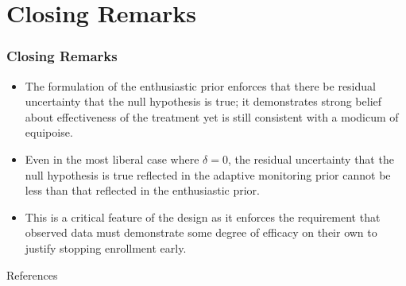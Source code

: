 \documentclass{beamer}
\begin{document}
\section{Closing Remarks}

\begin{frame} \frametitle{Closing Remarks}
		\begin{itemize}
			\item The formulation of the enthusiastic prior enforces that there be residual uncertainty 
						that the null hypothesis is true; it demonstrates strong belief about effectiveness 
						of the treatment yet is still consistent with a modicum of equipoise.
			
			\vspace{0.75cm}	
			\item Even in the most liberal case where $\delta=0$, the residual uncertainty that the null hypothesis is true 
						reflected in the adaptive monitoring prior cannot be less than that reflected in the 
						enthusiastic prior.
			
			\vspace{0.75cm}	
			\item This is a critical feature of the design as it enforces the requirement that observed data 
			      must demonstrate some degree of efficacy on their own to justify stopping enrollment early.
		 \end{itemize}
\end{frame}


\begin{frame}[t,allowframebreaks]{References}
% 

	
%
\end{frame}
\end{document}
